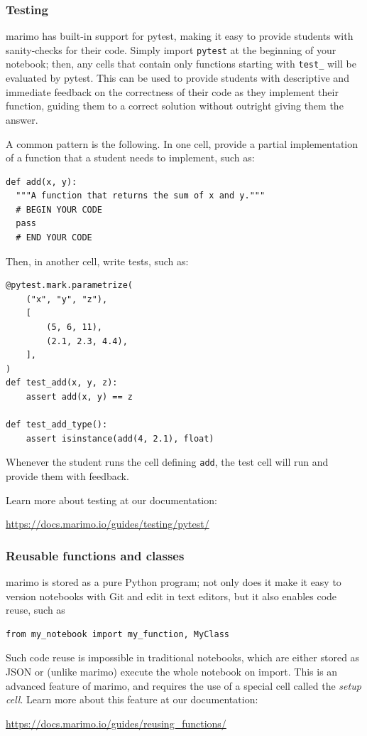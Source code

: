 \documentclass{article}
\begin{document}
\subsubsection{Testing} marimo has built-in support for pytest, making it easy to
provide students with sanity-checks for their code. Simply import \texttt{pytest} 
at the beginning of your notebook; then, any cells that contain only functions starting
with \texttt{test\_} will be evaluated by pytest. This can be used to provide students
with descriptive and immediate feedback on the correctness of their code as they implement
their function, guiding them to a correct solution without outright giving them the answer.

A common pattern is the following. In one cell, provide a partial
implementation of a function that a student needs to implement, such as:

\begin{lstlisting}
def add(x, y):
  """A function that returns the sum of x and y."""
  # BEGIN YOUR CODE
  pass
  # END YOUR CODE
\end{lstlisting}
Then, in another cell, write tests, such as:

\begin{lstlisting}
@pytest.mark.parametrize(
    ("x", "y", "z"),
    [
        (5, 6, 11),
        (2.1, 2.3, 4.4),
    ],
)
def test_add(x, y, z):
    assert add(x, y) == z

def test_add_type():
    assert isinstance(add(4, 2.1), float)
\end{lstlisting}
Whenever the student runs the cell defining \texttt{add}, the test cell will run and provide
them with feedback.

Learn more about testing at our documentation:
\begin{center}
  \url{https://docs.marimo.io/guides/testing/pytest/}
\end{center}

\subsubsection{Reusable functions and classes} marimo is stored as a pure Python program;
not only does it make it easy to version notebooks with Git and edit in text editors,
but it also enables code reuse, such as

\begin{lstlisting}
from my_notebook import my_function, MyClass
\end{lstlisting}
Such code reuse is impossible in traditional notebooks, which are either stored as JSON or
(unlike marimo) execute the whole notebook on import. This is an advanced feature of marimo,
and requires the use of a special cell called the \emph{setup cell}. Learn more
about this feature at our documentation:

\begin{center}
  \url{https://docs.marimo.io/guides/reusing_functions/}
\end{center}
\end{document}
